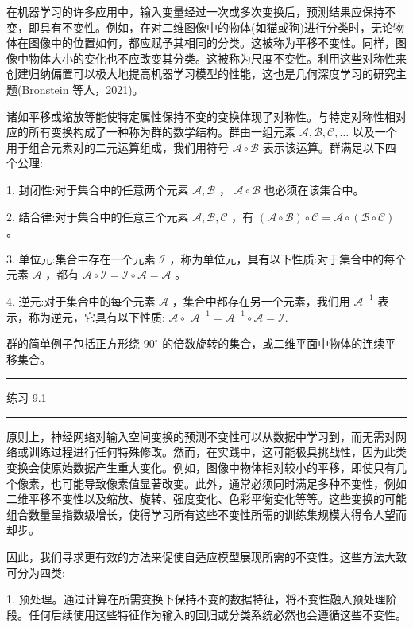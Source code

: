 \documentclass[10pt]{article}
\newcommand{\HRule}{\begin{center}\rule{0.9\linewidth}{0.2mm}\end{center}}
\begin{document}
在机器学习的许多应用中，输入变量经过一次或多次变换后，预测结果应保持不变，即具有不变性。例如，在对二维图像中的物体(如猫或狗)进行分类时，无论物体在图像中的位置如何，都应赋予其相同的分类。这被称为平移不变性。同样，图像中物体大小的变化也不应改变其分类。这被称为尺度不变性。利用这些对称性来创建归纳偏置可以极大地提高机器学习模型的性能，这也是几何深度学习的研究主题(Bronstein 等人，2021)。

诸如平移或缩放等能使特定属性保持不变的变换体现了对称性。与特定对称性相对应的所有变换构成了一种称为群的数学结构。群由一组元素 \(\mathcal{A},\mathcal{B},\mathcal{C},\ldots\) 以及一个用于组合元素对的二元运算组成，我们用符号 \(\mathcal{A} \circ  \mathcal{B}\) 表示该运算。群满足以下四个公理:

1. 封闭性:对于集合中的任意两个元素 \(\mathcal{A},\mathcal{B}\) ， \(\mathcal{A} \circ  \mathcal{B}\) 也必须在该集合中。

2. 结合律:对于集合中的任意三个元素 \(\mathcal{A},\mathcal{B},\mathcal{C}\) ，有 \(\left( {\mathcal{A} \circ  \mathcal{B}}\right)  \circ  \mathcal{C} = \mathcal{A} \circ  \left( {\mathcal{B} \circ  \mathcal{C}}\right)\) 。

3. 单位元:集合中存在一个元素 \(\mathcal{I}\) ，称为单位元，具有以下性质:对于集合中的每个元素 \(\mathcal{A}\) ，都有 \(\mathcal{A} \circ  \mathcal{I} = \mathcal{I} \circ  \mathcal{A} = \mathcal{A}\) 。

4. 逆元:对于集合中的每个元素 \(\mathcal{A}\) ，集合中都存在另一个元素，我们用 \({\mathcal{A}}^{-1}\) 表示，称为逆元，它具有以下性质: \(\mathcal{A} \circ\)  \({\mathcal{A}}^{-1} = {\mathcal{A}}^{-1} \circ  \mathcal{A} = \mathcal{I}.\)

群的简单例子包括正方形绕 \({90}^{ \circ  }\) 的倍数旋转的集合，或二维平面中物体的连续平移集合。

\HRule

练习 9.1

\HRule

原则上，神经网络对输入空间变换的预测不变性可以从数据中学习到，而无需对网络或训练过程进行任何特殊修改。然而，在实践中，这可能极具挑战性，因为此类变换会使原始数据产生重大变化。例如，图像中物体相对较小的平移，即使只有几个像素，也可能导致像素值显著改变。此外，通常必须同时满足多种不变性，例如二维平移不变性以及缩放、旋转、强度变化、色彩平衡变化等等。这些变换的可能组合数量呈指数级增长，使得学习所有这些不变性所需的训练集规模大得令人望而却步。

因此，我们寻求更有效的方法来促使自适应模型展现所需的不变性。这些方法大致可分为四类:

1. 预处理。通过计算在所需变换下保持不变的数据特征，将不变性融入预处理阶段。任何后续使用这些特征作为输入的回归或分类系统必然也会遵循这些不变性。
\end{document}
